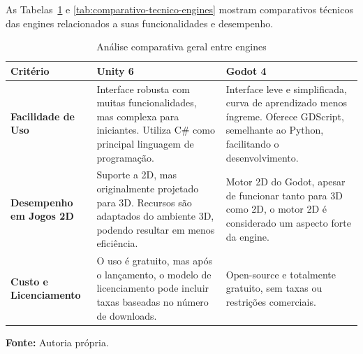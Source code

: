 As Tabelas~\ref{tab:comparacao-engines} e \ref{tab:comparativo-tecnico-engines} mostram comparativos técnicos das engines relacionados a suas funcionalidades e desempenho.

\begin{table}[H]
\centering
\caption{Análise comparativa geral entre engines}
\label{tab:comparacao-engines}
\begin{tabularx}{\textwidth}{|>{\bfseries}l|X|X|}
\hline
\textbf{Critério} & \textbf{Unity 6} & \textbf{Godot 4} \\
\hline
Facilidade de Uso & 
Interface robusta com muitas funcionalidades, mas complexa para iniciantes. Utiliza C\# como principal linguagem de programação. & 
Interface leve e simplificada, curva de aprendizado menos íngreme. Oferece GDScript, semelhante ao Python, facilitando o desenvolvimento. \\
\hline
Desempenho em Jogos 2D & 
Suporte a 2D, mas originalmente projetado para 3D. Recursos são adaptados do ambiente 3D, podendo resultar em menos eficiência. & 
Motor 2D do Godot, apesar de funcionar tanto para 3D como 2D, o motor 2D é considerado um aspecto forte da engine. \\
\hline
Custo e Licenciamento & 
O uso é gratuito, mas após o lançamento, o modelo de licenciamento pode incluir taxas baseadas no número de downloads. & 
Open-source e totalmente gratuito, sem taxas ou restrições comerciais. \\
\hline
\end{tabularx}

\smallskip
\raggedleft \textbf{Fonte:} Autoria própria.
\end{table}

